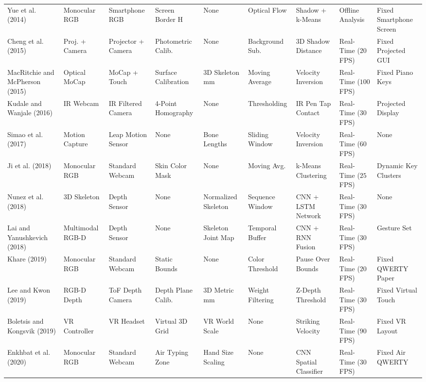 \begin{table}[htbp]
\begin{tabular}{l l l l l l l l l}
Yue et al. (2014) \cite{Yue2014Blind} & Monocular RGB & Smartphone RGB & Screen Border H & None & Optical Flow & Shadow + k-Means & Offline Analysis & Fixed Smartphone Screen \\
Cheng et al. (2015) \cite{Cheng2015Fingertip} & Proj. + Camera & Projector + Camera & Photometric Calib. & None & Background Sub. & 3D Shadow Distance & Real-Time ($20$ FPS) & Fixed Projected GUI \\
MacRitchie and McPherson (2015) \cite{MacRitchie2015Integrating} & Optical MoCap & MoCap + Touch & Surface Calibration & 3D Skeleton mm & Moving Average & Velocity Inversion & Real-Time ($100$ FPS) & Fixed Piano Keys \\
Kudale and Wanjale (2016) \cite{Kudale2016RealTime} & IR Webcam & IR Filtered Camera & 4-Point Homography & None & Thresholding & IR Pen Tap Contact & Real-Time ($30$ FPS) & Projected Display \\
Simao et al. (2017) \cite{Simao2016Unsupervised} & Motion Capture & Leap Motion Sensor & None & Bone Lengths & Sliding Window & Velocity Inversion & Real-Time ($60$ FPS) & None \\
Ji et al. (2018) \cite{Ji2018Local} & Monocular RGB & Standard Webcam & Skin Color Mask & None & Moving Avg. & k-Means Clustering & Real-Time ($25$ FPS) & Dynamic Key Clusters \\
Nunez et al. (2018) \cite{Nunez2018Convolutional} & 3D Skeleton & Depth Sensor & None & Normalized Skeleton & Sequence Window & CNN + LSTM Network & Real-Time ($30$ FPS) & None \\
Lai and Yanushkevich (2018) \cite{Lai2018CNN} & Multimodal RGB-D & Depth Sensor & None & Skeleton Joint Map & Temporal Buffer & CNN + RNN Fusion & Real-Time ($30$ FPS) & Gesture Set \\
Khare (2019) \cite{Khare2019QWERTY} & Monocular RGB & Standard Webcam & Static Bounds & None & Color Threshold & Pause Over Bounds & Real-Time ($20$ FPS) & Fixed QWERTY Paper \\
Lee and Kwon (2019) \cite{Lee2019Virtual} & RGB-D Depth & ToF Depth Camera & Depth Plane Calib. & 3D Metric mm & Weight Filtering & Z-Depth Threshold & Real-Time ($30$ FPS) & Fixed Virtual Touch \\
Boletsis and Kongsvik (2019) \cite{Boletsis2019TextInput} & VR Controller & VR Headset & Virtual 3D Grid & VR World Scale & None & Striking Velocity & Real-Time ($90$ FPS) & Fixed VR Layout \\
Enkhbat et al. (2020) \cite{Enkhbat2020HandKey} & Monocular RGB & Standard Webcam & Air Typing Zone & Hand Size Scaling & None & CNN Spatial Classifier & Real-Time ($30$ FPS) & Fixed Air QWERTY \\

\end{tabular}
\end{table}
